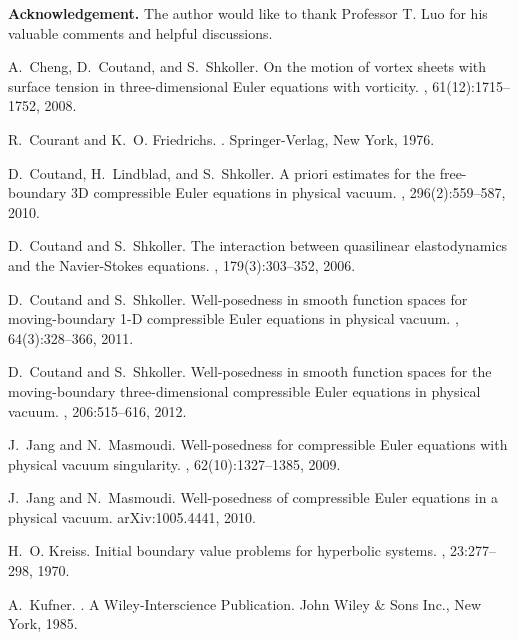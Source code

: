 \documentclass[12pt,twoside,reqno]{amsart}
\numberwithin{equation}{section}
\theoremstyle{definition}
\theoremstyle{remark}
\begin{document}
\medskip

\textbf{Acknowledgement.}
  The author would like to thank Professor T. Luo for his valuable
comments and helpful discussions.

\begin{thebibliography}{10}

A.~Cheng, D.~Coutand, and S.~Shkoller.
\newblock On the motion of vortex sheets with surface tension in
  three-dimensional {E}uler equations with vorticity.
, 61(12):1715--1752, 2008.

R.~Courant and K.~O. Friedrichs.
.
\newblock Springer-Verlag, New York, 1976.

D.~Coutand, H.~Lindblad, and S.~Shkoller.
\newblock A priori estimates for the free-boundary 3{D} compressible {E}uler
  equations in physical vacuum.
, 296(2):559--587, 2010.

D.~Coutand and S.~Shkoller.
\newblock The interaction between quasilinear elastodynamics and the
  {N}avier-{S}tokes equations.
, 179(3):303--352, 2006.

D.~Coutand and S.~Shkoller.
\newblock Well-posedness in smooth function spaces for moving-boundary 1-{D}
  compressible {E}uler equations in physical vacuum.
, 64(3):328--366, 2011.

D.~Coutand and S.~Shkoller.
\newblock Well-posedness in smooth function spaces for the moving-boundary
  three-dimensional compressible {E}uler equations in physical vacuum.
, 206:515--616, 2012.

J.~Jang and N.~Masmoudi.
\newblock Well-posedness for compressible {E}uler equations with physical
  vacuum singularity.
, 62(10):1327--1385, 2009.

J.~Jang and N.~Masmoudi.
\newblock Well-posedness of compressible {E}uler equations in a physical
  vacuum.
\newblock arXiv:1005.4441, 2010.

H.~O. Kreiss.
\newblock Initial boundary value problems for hyperbolic systems.
, 23:277--298, 1970.

A.~Kufner.
.
\newblock A Wiley-Interscience Publication. John Wiley \& Sons Inc., New York,
  1985.


\end{thebibliography}
\end{document}
